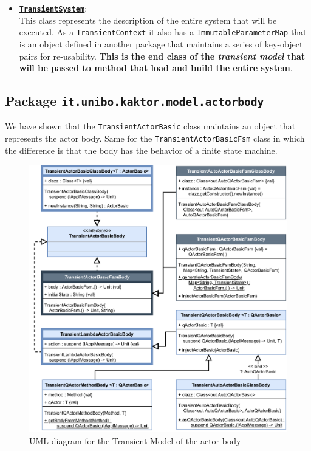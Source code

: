 \begin{itemize}
	\item 
	\href{https://github.com/LM-96/QA-Extensions/blob/main/it.unibo.qakactor/src/main/kotlin/model/TransientSystem.kt}{\underline{\textbf{\texttt{TransientSystem}}}}:\\
	This class represents the description of the entire system that will be executed. As a \texttt{TransientContext} it also has a \texttt{ImmutableParameterMap} that is an object defined in another package that maintains a series of key-object pairs for re-usability.
	\textbf{This is the end class of the \textit{transient model} that will be passed to method that load and build the entire system}.
\end{itemize}

\subsection{Package \texttt{it.unibo.kaktor.model.actorbody}}

We have shown that the \texttt{TransientActorBasic} class maintains an object that represents the actor body. Same for the \texttt{TransientActorBasicFsm} class in which the difference is that the body has the behavior of a finite state machine.

\begin{figure}[h!]
	\centering
	\includegraphics[width=\textwidth]{img/[UML]it.unibo.kaktor.model.actorbody_onlyactorbody}
	\caption{UML diagram for the Transient Model of the actor body}
	\label{fig::uml_model_body}
\end{figure}

